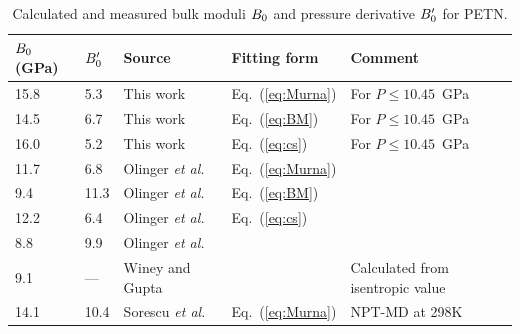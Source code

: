 \documentclass[prb,aps,nobibnotes,twocolumn,doublespace,twocolumngrid,superbib]{revtex4}
\begin{document}
\begin{table}[p]
\begin{center}
\begin{tabular}{lllll}
\hline\hline
$B_0$(GPa) &   ${B'_0}$   &   Source  &    Fitting form &      Comment \\
\hline
15.8 & 5.3 & This work &  Eq.~(\ref{eq:Murna}) & For $P \le 10.45$~GPa \\
14.5 & 6.7 & This work & Eq.~(\ref{eq:BM}) & For $P \le 10.45$~GPa \\
16.0 & 5.2 & This work & Eq.~(\ref{eq:cs}) & For $P \le 10.45$~GPa \\
11.7 & 6.8 & Olinger {\it et al.}~\cite{Olinger_1975v62} & Eq.~(\ref{eq:Murna}) \\
9.4 & 11.3 & Olinger {\it et al.}~\cite{Olinger_1975v62} & Eq.~(\ref{eq:BM}) \\
12.2 & 6.4 & Olinger {\it et al.}~\cite{Olinger_1975v62} & Eq.~(\ref{eq:cs}) \\
8.8 & 9.9 &   Olinger {\it et al.}~\cite{Olinger_1976}&   &                  \\
 9.1 & --- &   Winey and Gupta~\cite{Winey_2001v90} &     & Calculated from isentropic value \\
14.1 &10.4 &Sorescu {\it et al.}~\cite{Sorescu_1999v103} & Eq.~(\ref{eq:Murna})&         NPT-MD at 298K\\
\hline\hline
\end{tabular}
\end{center}
\caption{Calculated and measured bulk moduli $B_0$ and pressure
derivative ${B'_0}$ for PETN.
}
\label{tab:table3}
\end{table}
\end{document}
